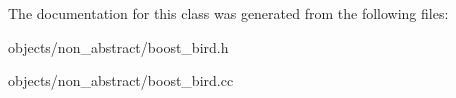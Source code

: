 The documentation for this class was generated from the following files\+:\begin{DoxyCompactItemize}
\item 
objects/non\+\_\+abstract/boost\+\_\+bird.\+h\item 
objects/non\+\_\+abstract/boost\+\_\+bird.\+cc\end{DoxyCompactItemize}
